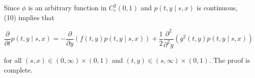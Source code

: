 \documentclass[10pt]{article}
\begin{document}
Since $\phi$ is an arbitrary function in $C_{c}^{2}(0,1)$ and $p(t, y \mid s, x)$ is continuous, (10) implies that


\begin{equation*}
\frac{\partial}{\partial t} p(t, y \mid s, x)=-\frac{\partial}{\partial y}(f(t, y) p(t, y \mid s, x))+\frac{1}{2} \frac{\partial^{2}}{\partial^{2} y}\left(g^{2}(t, y) p(t, y \mid s, x)\right) \tag{11}
\end{equation*}


for all $(s, x) \in(0, \infty) \times(0,1)$ and $(t, y) \in(s, \infty) \times(0,1)$. The proof is complete.
\end{document}
